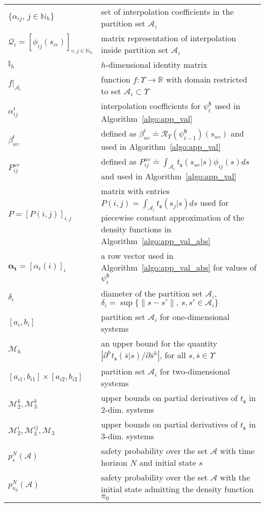 \documentclass{LMCS}
\begin{document}
\begin{longtable}{lp{10.5cm}}
$\{\alpha_{ij},\,j\in\mathbb N_h\}$ & set of interpolation coefficients in the partition set $\mathcal A_i$\\
$\mathcal Q_i = [\phi_{ij}(s_{iv})]_{v,j\in\mathbb N_h}$& matrix representation of interpolation inside partition set $\mathcal A_i$\\
$\mathbb I_h$& $h$-dimensional identity matrix\\
$f|_{\mathcal A_i}$& function $f:\Upsilon\rightarrow \mathbb{R}$ with domain restricted to set $\mathcal A_i\subset\Upsilon$\\
$\alpha_{ij}^{t}$ & interpolation coefficients for $\psi_t^{\mathfrak h}$ used in Algorithm~\ref{algo:app_val}\\
$\beta^{t}_{uv}$ & defined as $\beta^{t}_{uv}\doteq\mathcal R_\Upsilon(\psi^{\mathfrak h}_{t-1})(s_{uv})$ and used in Algorithm~\ref{algo:app_val}\\
$P_{ij}^{uv}$ & defined as $P_{ij}^{uv}\doteq \int_{\mathcal A_i}t_{\mathfrak s}(s_{uv}|s)\phi_{ij}(s)ds$ and used in Algorithm~\ref{algo:app_val}\\
$P = [P(i,j)]_{i,j}$ & matrix with entries $P(i,j) = \int_{\mathcal A_i}t_{\mathfrak s}(s_j|s)ds$ used for piecewise constant approximation of the density functions in Algorithm~\ref{algo:app_val_abs}\\
$\boldsymbol{\alpha_t} = [\alpha_t(i)]_i$& a row vector used in Algorithm~\ref{algo:app_val_abs} for values of  $\psi_t^{\mathfrak h}$\\
$\delta_i$& diameter of the partition set $\mathcal A_i$, $\delta_i = \sup\{\|s-s'\|,\,s,s'\in\mathcal A_i\}$\\
$[a_i,b_i]$& partition set $\mathcal A_i$ for one-dimensional systems\\
$\mathcal M_h$& an upper bound for the quantity $ \left|\partial^h t_{\mathfrak s}(\bar s|s)/\partial \bar s^h\right|$, for all $s,\bar s\in\Upsilon$\\
$[a_{i1},b_{i1}]\times[a_{i2},b_{i2}]$& partition set $\mathcal A_i$ for two-dimensional systems \\
$\mathcal M_2^k,\mathcal M_3^k$& upper bounds on partial derivatives of $t_{\mathfrak s}$ in 2-dim. systems\\
$\mathcal M_2^i,\mathcal M_3^{ij},\mathcal M_3$&  upper bounds on partial derivatives of $t_{\mathfrak s}$ in 3-dim. systems\\
$p_s^N(\mathcal A)$ & safety probability over the set $\mathcal A$ with time horizon $N$ and initial state $s$\\
$p_{\pi_0}^N(\mathcal A)$ & safety probability over the set $\mathcal A$ with the initial state admitting the density function $\pi_0$\\

\end{longtable}
\end{document}
